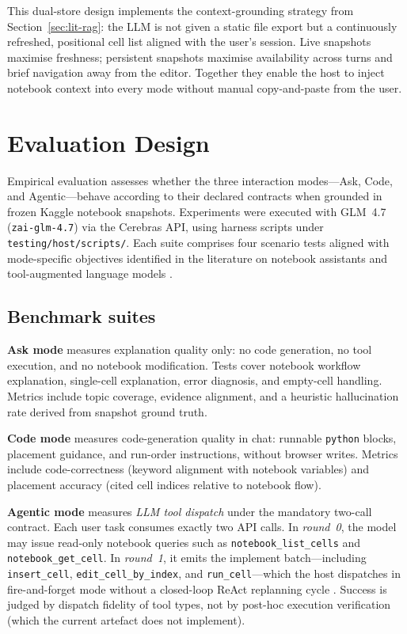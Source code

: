 This dual-store design implements the context-grounding strategy from Section~\ref{sec:lit-rag}: the \ac{LLM} is not given a static file export but a continuously refreshed, positional cell list aligned with the user's session. Live snapshots maximise freshness; persistent snapshots maximise availability across turns and brief navigation away from the editor. Together they enable the host to inject notebook context into every mode without manual copy-and-paste from the user.

\section{Evaluation Design}
\label{sec:evaluation}

Empirical evaluation assesses whether the three interaction modes---Ask, Code, and Agentic---behave according to their declared contracts when grounded in frozen Kaggle notebook snapshots. Experiments were executed with GLM~4.7 (\texttt{zai-glm-4.7}) via the Cerebras \ac{API}, using harness scripts under \texttt{testing/host/scripts/}. Each suite comprises four scenario tests aligned with mode-specific objectives identified in the literature on notebook assistants \parencite{mcnutt2023notebookassistants} and tool-augmented language models \parencite{qin2024toolllm,yao2023react}.

\subsection{Benchmark suites}

\textbf{Ask mode} measures explanation quality only: no code generation, no tool execution, and no notebook modification. Tests cover notebook workflow explanation, single-cell explanation, error diagnosis, and empty-cell handling. Metrics include topic coverage, evidence alignment, and a heuristic hallucination rate derived from snapshot ground truth.

\textbf{Code mode} measures code-generation quality in chat: runnable \texttt{python} blocks, placement guidance, and run-order instructions, without browser writes. Metrics include code-correctness (keyword alignment with notebook variables) and placement accuracy (cited cell indices relative to notebook flow).

\textbf{Agentic mode} measures \emph{LLM tool dispatch} under the mandatory two-call contract. Each user task consumes exactly two \ac{API} calls. In \emph{round~0}, the model may issue read-only notebook queries such as \texttt{notebook\_list\_cells} and \texttt{notebook\_get\_cell}. In \emph{round~1}, it emits the implement batch---including \texttt{insert\_cell}, \texttt{edit\_cell\_by\_index}, and \texttt{run\_cell}---which the host dispatches in fire-and-forget mode without a closed-loop ReAct replanning cycle \parencite{yao2023react,shinn2023reflexion}. Success is judged by dispatch fidelity of tool types, not by post-hoc execution verification (which the current artefact does not implement).

